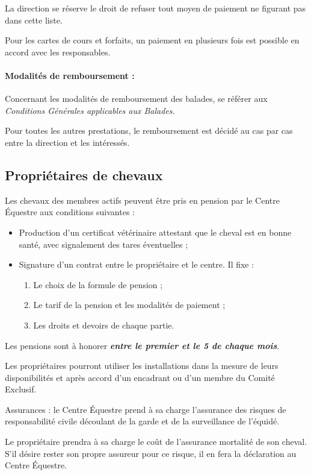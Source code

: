 \documentclass[11pt,a4paper]{article}
\begin{document}
La direction se réserve le droit de refuser tout moyen de paiement ne figurant pas dans cette liste.

Pour les cartes de cours et forfaits, un paiement en plusieurs fois est possible en accord avec les responsables.

\paragraph{Modalités de remboursement :\\}
Concernant les modalités de remboursement des balades, se référer aux \textit{Conditions Générales applicables aux Balades}.

Pour toutes les autres prestations, le remboursement est décidé au cas par cas entre la direction et les intéressés.


\subsection{Propriétaires de chevaux}
Les chevaux des membres actifs peuvent être pris en pension par le Centre Équestre aux conditions suivantes :
\begin{itemize}
\item
Production d'un certificat vétérinaire attestant que le cheval est en bonne santé, avec signalement des tares éventuelles ;
\item
Signature d'un contrat entre le propriétaire et le centre. Il fixe :
\begin{enumerate}
\item
Le choix de la formule de pension ;
\item
Le tarif de la pension et les modalités de paiement ;
\item
Les droits et devoirs de chaque partie.
\end{enumerate}
\end{itemize}
Les pensions sont à honorer \textit{\textbf{entre le premier et le 5 de chaque mois}}.

Les propriétaires pourront utiliser les installations dans la mesure de leurs disponibilités et après accord d'un encadrant ou d'un membre du Comité Exclusif. \par
Assurances : le Centre Équestre prend à sa charge l'assurance des risques de responsabilité civile découlant de la garde et de la surveillance de l'équidé.

Le propriétaire prendra à sa charge le coût de l'assurance mortalité de son cheval. S'il désire rester son propre assureur pour ce risque, il en fera la déclaration au Centre Équestre.
\end{document}
